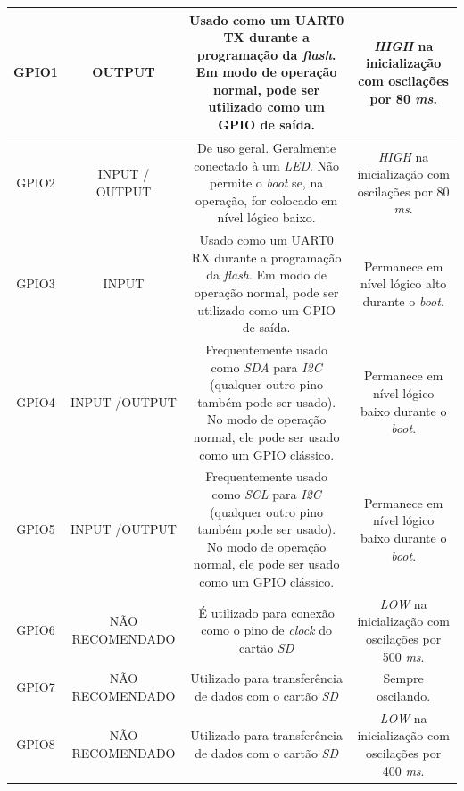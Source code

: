 \begin{anexosenv}
\begin{center}
\begin{longtable}{c|c|c|c}
		GPIO1 & OUTPUT & \multicolumn{1}{m{5cm}|}{Usado como um UART0 TX durante a programação da \textit{flash}. Em modo de operação normal, pode ser utilizado como um GPIO de saída.} &  \multicolumn{1}{m{4cm}}{\textit{HIGH} na inicialização com oscilações por 80 \textit{ms}.} \\ \hline
		
		GPIO2 & INPUT / OUTPUT & \multicolumn{1}{m{5cm}|}{De uso geral. Geralmente conectado à um \textit{LED}. Não permite o \textit{boot} se, na operação, for colocado em nível lógico baixo.} & \multicolumn{1}{m{4cm}}{\textit{HIGH} na inicialização com oscilações por 80 \textit{ms}.}\\ \hline
		
		GPIO3 & INPUT & \multicolumn{1}{m{5cm}|}{Usado como um UART0 RX durante a programação da \textit{flash}. Em modo de operação normal, pode ser utilizado como um GPIO de saída.} & \multicolumn{1}{m{4cm}}{Permanece em nível lógico alto durante o \textit{boot}.}\\ \hline
		
		GPIO4 & INPUT /OUTPUT & \multicolumn{1}{m{5cm}|}{Frequentemente usado como \textit{SDA} para \textit{I2C} (qualquer outro pino também pode ser usado). No modo de operação normal, ele pode ser usado como um GPIO clássico.} & \multicolumn{1}{m{4cm}}{Permanece em nível lógico baixo durante o \textit{boot}.}\\ \hline
		
		GPIO5 & INPUT /OUTPUT & \multicolumn{1}{m{5cm}|}{Frequentemente usado como \textit{SCL} para \textit{I2C} (qualquer outro pino também pode ser usado). No modo de operação normal, ele pode ser usado como um GPIO clássico.} & \multicolumn{1}{m{4cm}}{Permanece em nível lógico baixo durante o \textit{boot}.}\\ \hline
		
		GPIO6 & NÃO RECOMENDADO & \multicolumn{1}{m{5cm}|}{É utilizado para conexão como o pino de \textit{clock} do cartão \textit{SD}} & \multicolumn{1}{m{4cm}}{\textit{LOW} na inicialização com oscilações por 500 \textit{ms}.}\\ \hline
		
		GPIO7 & NÃO RECOMENDADO & \multicolumn{1}{m{5cm}|}{Utilizado para transferência de dados com o cartão \textit{SD}} & \multicolumn{1}{m{4cm}}{Sempre oscilando.}\\ \hline
		
		GPIO8 & NÃO RECOMENDADO & \multicolumn{1}{m{5cm}|}{Utilizado para transferência de dados com o cartão \textit{SD}} & \multicolumn{1}{m{4cm}}{\textit{LOW} na inicialização com oscilações por 400 \textit{ms}.}\\ \hline
		

\end{longtable}
\end{center}
\end{anexosenv}
